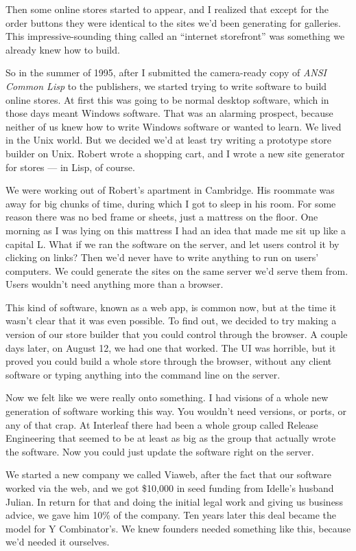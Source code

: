 Then some online stores started to appear, and I realized that except
for the order buttons they were identical to the sites we'd been
generating for galleries. This impressive-sounding thing called an
``internet storefront'' was something we already knew how to build.

So in the summer of 1995, after I submitted the camera-ready copy of
\emph{ANSI Common Lisp} to the publishers, we started trying to write
software to build online stores. At first this was going to be normal
desktop software, which in those days meant Windows software. That was
an alarming prospect, because neither of us knew how to write Windows
software or wanted to learn. We lived in the Unix world. But we decided
we'd at least try writing a prototype store builder on Unix. Robert
wrote a shopping cart, and I wrote a new site generator for stores ---
in Lisp, of course.

We were working out of Robert's apartment in Cambridge. His roommate was
away for big chunks of time, during which I got to sleep in his room.
For some reason there was no bed frame or sheets, just a mattress on the
floor. One morning as I was lying on this mattress I had an idea that
made me sit up like a capital L. What if we ran the software on the
server, and let users control it by clicking on links? Then we'd never
have to write anything to run on users' computers. We could generate the
sites on the same server we'd serve them from. Users wouldn't need
anything more than a browser.

This kind of software, known as a web app, is common now, but at the
time it wasn't clear that it was even possible. To find out, we decided
to try making a version of our store builder that you could control
through the browser. A couple days later, on August 12, we had one that
worked. The UI was horrible, but it proved you could build a whole store
through the browser, without any client software or typing anything into
the command line on the server.

Now we felt like we were really onto something. I had visions of a whole
new generation of software working this way. You wouldn't need versions,
or ports, or any of that crap. At Interleaf there had been a whole group
called Release Engineering that seemed to be at least as big as the
group that actually wrote the software. Now you could just update the
software right on the server.

We started a new company we called Viaweb, after the fact that our
software worked via the web, and we got \$10,000 in seed funding from
Idelle's husband Julian. In return for that and doing the initial legal
work and giving us business advice, we gave him 10\% of the company. Ten
years later this deal became the model for Y Combinator's. We knew
founders needed something like this, because we'd needed it ourselves.

